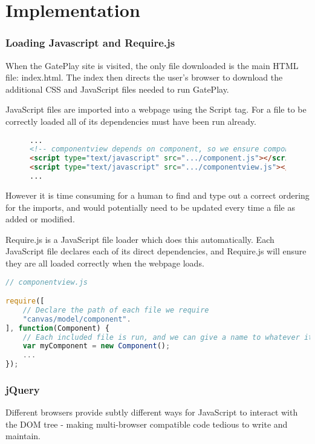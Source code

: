 \chapter{Implementation}
\subsection{Loading Javascript and Require.js}
When the GatePlay site is visited, the only file downloaded is the main HTML file: index.html. The index then directs the user's browser to download the additional CSS and JavaScript files needed to run GatePlay.

JavaScript files are imported into a webpage using the Script tag. For a file to be correctly loaded all of its dependencies must have been run already.

\begin{figure}
\begin{lstlisting}[language=html]
...
<!-- componentview depends on component, so we ensure component is loaded first -->
<script type="text/javascript" src=".../component.js"></script>
<script type="text/javascript" src=".../componentview.js"></script>
...
\end{lstlisting}
\caption{}
\end{figure}

However it is time consuming for a human to find and type out a correct ordering for the imports, and would potentially need to be updated every time a file as added or modified.

Require.js is a JavaScript file loader which does this automatically. Each JavaScript file declares each of its direct dependencies, and Require.js will ensure they are all loaded correctly when the webpage loads.

\begin{lstlisting}[language=JavaScript]
// componentview.js

require([
	// Declare the path of each file we require	
	"canvas/model/component".
], function(Component) {
	// Each included file is run, and we can give a name to whatever it returns if desired
	var myComponent = new Component();
	...
});
\end{lstlisting}

\subsection{jQuery}
Different browsers provide subtly different ways for JavaScript to interact with the DOM tree - making multi-browser compatible code tedious to write and maintain.

